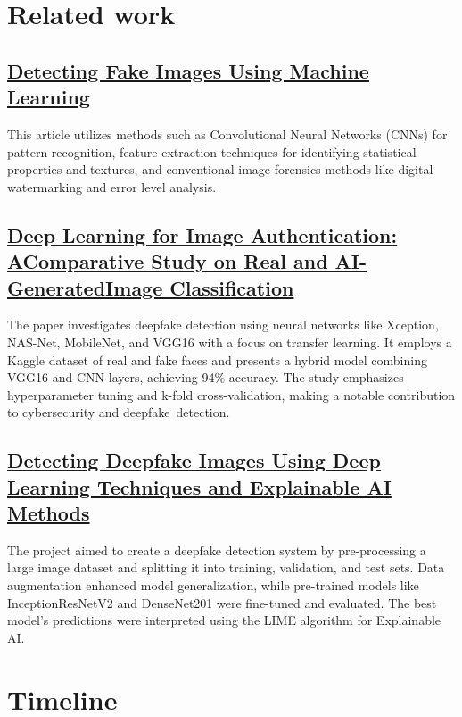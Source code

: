 \documentclass[10pt,twocolumn,letterpaper]{article}
\begin{document}
\section{Related work}

\subsection{\href{https://ijrpr.com/uploads/V4ISSUE4/IJRPR11629.pdf}{Detecting Fake Images Using Machine Learning}}
This article utilizes methods such as Convolutional Neural Networks (CNNs) for pattern recognition, feature extraction techniques for identifying statistical properties and textures, and conventional image forensics methods like digital watermarking and error level analysis.
\subsection{\href{https://www.researchgate.net/publication/375952278_Deep_Learning_for_Image_Authentication_A_Comparative_Study_on_Real_and_AI-Generated_Image_Classification}{Deep Learning for Image Authentication: AComparative Study on Real and AI-GeneratedImage Classification}}
The paper investigates deepfake detection using neural networks like Xception, NAS-Net, MobileNet, and VGG16 with a focus on transfer learning. It employs a Kaggle dataset of real and fake faces and presents a hybrid model combining VGG16 and CNN layers, achieving 94\% accuracy. The study emphasizes hyperparameter tuning and k-fold cross-validation, making a notable contribution to cybersecurity and deepfake detection.
\subsection{\href{https://www.techscience.com/iasc/v35n2/48928/html}{Detecting Deepfake Images Using Deep Learning Techniques and Explainable AI Methods}}
The project aimed to create a deepfake detection system by pre-processing a large image dataset and splitting it into training, validation, and test sets. Data augmentation enhanced model generalization, while pre-trained models like InceptionResNetV2 and DenseNet201 were fine-tuned and evaluated. The best model's predictions were interpreted using the LIME algorithm for Explainable AI.

\section{Timeline}
\end{document}
